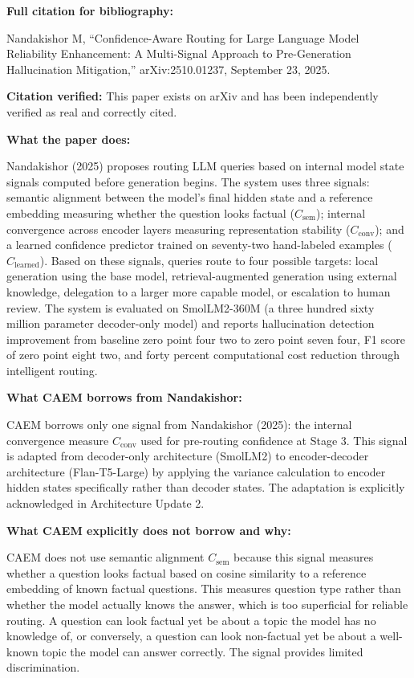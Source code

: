 \documentclass[11pt,a4paper]{article}
\newcommand{\citationbox}[2]{%
\begin{tcolorbox}[enhanced,breakable,
  colback=LightNavy,colframe=NavyBlue,boxrule=1.5pt,arc=4pt,
  left=8pt,right=8pt,top=6pt,bottom=6pt,
  title={\bfseries\small\color{white}#1},
  attach boxed title to top left={yshift=-2mm,xshift=6mm},
  boxed title style={colback=NavyBlue,arc=3pt,boxrule=0pt,
    left=4pt,right=4pt,top=2pt,bottom=2pt}]
#2
\end{tcolorbox}}
\newcommand{\Cconv}{C_{\text{conv}}}
\begin{document}
\citationbox{CITATION 1: Nandakishor (2025) Confidence-Aware Routing}{
\textbf{Full citation for bibliography:}

Nandakishor M, ``Confidence-Aware Routing for Large Language Model Reliability Enhancement: A Multi-Signal Approach to Pre-Generation Hallucination Mitigation,'' arXiv:2510.01237, September 23, 2025.

\textbf{Citation verified:} This paper exists on arXiv and has been independently verified as real and correctly cited.

\textbf{What the paper does:}

Nandakishor (2025) proposes routing LLM queries based on internal model state signals computed before generation begins. The system uses three signals: semantic alignment between the model's final hidden state and a reference embedding measuring whether the question looks factual ($C_{\text{sem}}$); internal convergence across encoder layers measuring representation stability ($\Cconv$); and a learned confidence predictor trained on seventy-two hand-labeled examples ($C_{\text{learned}}$). Based on these signals, queries route to four possible targets: local generation using the base model, retrieval-augmented generation using external knowledge, delegation to a larger more capable model, or escalation to human review. The system is evaluated on SmolLM2-360M (a three hundred sixty million parameter decoder-only model) and reports hallucination detection improvement from baseline zero point four two to zero point seven four, F1 score of zero point eight two, and forty percent computational cost reduction through intelligent routing.

\textbf{What CAEM borrows from Nandakishor:}

CAEM borrows only one signal from Nandakishor (2025): the internal convergence measure $\Cconv$ used for pre-routing confidence at Stage 3. This signal is adapted from decoder-only architecture (SmolLM2) to encoder-decoder architecture (Flan-T5-Large) by applying the variance calculation to encoder hidden states specifically rather than decoder states. The adaptation is explicitly acknowledged in Architecture Update 2.

\textbf{What CAEM explicitly does not borrow and why:}

CAEM does not use semantic alignment $C_{\text{sem}}$ because this signal measures whether a question looks factual based on cosine similarity to a reference embedding of known factual questions. This measures question type rather than whether the model actually knows the answer, which is too superficial for reliable routing. A question can look factual yet be about a topic the model has no knowledge of, or conversely, a question can look non-factual yet be about a well-known topic the model can answer correctly. The signal provides limited discrimination.

}
\end{document}
